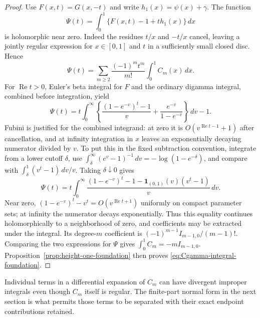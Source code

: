 \documentclass[11pt,a4paper]{article}
\numberwithin{equation}{section}
\theoremstyle{plain}
\theoremstyle{definition}
\theoremstyle{remark}
\newcommand{\re}{\operatorname{Re}}
\begin{document}
\begin{proof}
Use $F(x,t)=G(x,-t)$ and write $h_1(x)=\psi(x)+\gamma$. The function
\[
 \Psi(t)=\int_0^1\{F(x,t)-1+t h_1(x)\}\,dx
\]
is holomorphic near zero. Indeed the residues $t/x$ and $-t/x$
cancel, leaving a jointly regular expression for $x\in[0,1]$ and
$t$ in a sufficiently small closed disc. Hence
\[
 \Psi(t)=\sum_{m\ge2}\frac{(-1)^m t^m}{m!}
                                  \int_0^1C_m(x)\,dx.
\]
For $\re t>0$, Euler's beta integral for $F$ and the ordinary
digamma integral, combined before integration, yield
\[
 \Psi(t)=t\int_0^\infty
   \left\{\frac{(1-e^{-v})^t-1}{v}
                    +\frac{e^{-v}}{1-e^{-v}}\right\}\,dv-1.
\]
Fubini is justified for the combined integrand: at zero it is
$O(v^{\re t-1}+1)$ after cancellation, and at infinity integration
in $x$ leaves an exponentially decaying numerator divided by $v$.
To put this in the fixed subtraction convention, integrate from a
lower cutoff $\delta$, use
$\int_\delta^\infty(e^v-1)^{-1}\,dv=-\log(1-e^{-\delta})$,
and compare with $\int_\delta^1(v^t-1)\,dv/v$. Taking
$\delta\downarrow0$ gives
\begin{equation}\label{eq:gamma-Psi-foundation}
 \Psi(t)=t\int_0^\infty
 \frac{(1-e^{-v})^t-1
       -\boldsymbol1_{(0,1)}(v)(v^t-1)}v\,dv.
\end{equation}
Near zero, $(1-e^{-v})^t-v^t=O(v^{\re t+1})$ uniformly on compact
parameter sets; at infinity the numerator decays exponentially.
Thus this equality continues holomorphically to a neighborhood of zero,
and coefficients may be extracted under the integral. Its degree-$m$
coefficient is $(-1)^{m-1}I_{m-1,0}/(m-1)!$.
Comparing the two expressions for $\Psi$ gives
$\int_0^1C_m=-mI_{m-1,0}$. Proposition~\ref{prop:height-one-foundation}
then proves \eqref{eq:Cgamma-integral-foundation}.
\end{proof}

Individual terms in a differential expansion of $C_m$ can have divergent
improper integrals even though $C_m$ itself is regular. The finite-part
normal form in the next section is what permits those terms to be
separated with their exact endpoint contributions retained.



\end{document}
